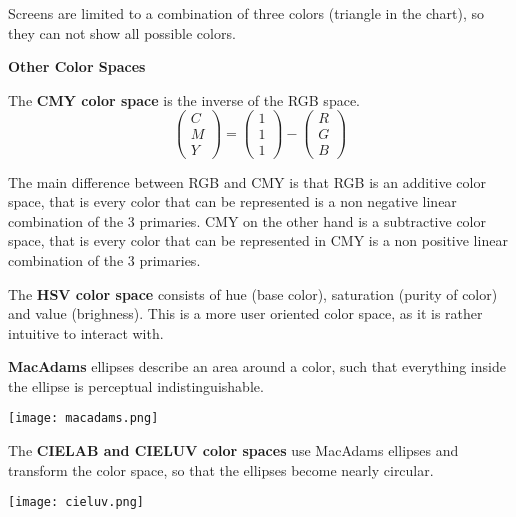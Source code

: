 Screens are limited to a combination of three colors (triangle  in the chart), so they can not show all possible colors.\medskip

\textbf{Other Color Spaces}\smallskip

The \textbf{CMY color space} is the inverse of the RGB space.
$$\begin{pmatrix}
	C \\ M \\ Y
\end{pmatrix} = \begin{pmatrix}
	1 \\ 1 \\ 1
\end{pmatrix} - \begin{pmatrix}
	R \\ G \\ B
\end{pmatrix}$$

The main difference between RGB and CMY is that RGB is an additive color space, that is every color that can be represented is a non negative linear combination of the 3 primaries. CMY on the other hand is a subtractive color space, that is every color that can be represented in CMY is a non positive linear combination of the 3 primaries. \medskip

The \textbf{HSV color space} consists of hue (base color), saturation (purity of color) and value (brighness). This is a more user oriented color space, as it is rather intuitive to interact with. \medskip

\textbf{MacAdams} ellipses describe an area around a color, such that everything inside the ellipse is perceptual indistinguishable.
\begin{center}
	\texttt{[image: macadams.png]}
\end{center}

The \textbf{CIELAB and CIELUV color spaces} use MacAdams ellipses and transform the color space, so that the ellipses become nearly circular.
\begin{center}
	\texttt{[image: cieluv.png]}
\end{center}


